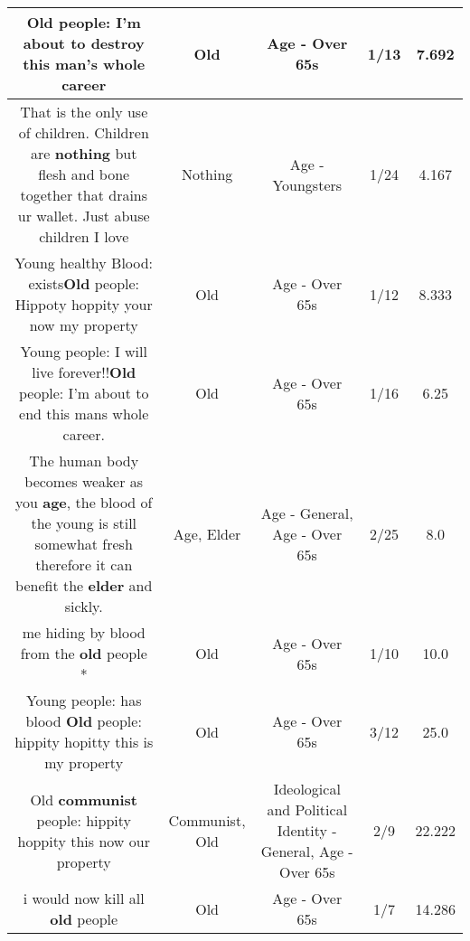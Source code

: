 \documentclass[11pt]{article}
\newlength\mylength
\begin{document}
\begin{center}
\begin{longtable}{|C{.65\mylength}|C{.30\mylength}|C{.12\mylength}|C{.12\mylength}|C{.12\mylength}|}
\textbf{Old} people: I'm about to destroy this man's whole career\normalsize   & Old & Age - Over 65s & 1/13 & 7.692 \\  \hline
  \small That is the only use of children. Children are \textbf{nothing} but flesh and bone together that drains ur wallet. Just abuse children I love\normalsize   & Nothing & Age - Youngsters & 1/24 & 4.167 \\  \hline
  \small Young healthy Blood: exists\textbf{Old} people: Hippoty hoppity your now my property\normalsize   & Old & Age - Over 65s & 1/12 & 8.333 \\  \hline
  \small Young people: I will live forever!!\textbf{Old} people: I'm about to end this mans whole career.\normalsize   & Old & Age - Over 65s & 1/16 & 6.25 \\  \hline
  \small The human body becomes weaker as you \textbf{age}, the blood of the young is still somewhat fresh therefore it can benefit the \textbf{elder} and sickly.\normalsize   & Age, Elder & Age - General, Age - Over 65s & 2/25 & 8.0 \\  \hline
  \small * me hiding by blood from the \textbf{old} people *\normalsize   & Old & Age - Over 65s & 1/10 & 10.0 \\  \hline
  \small Young people: has blood \textbf{Old} people: hippity hopitty this is my property\normalsize   & Old & Age - Over 65s & 3/12 & 25.0 \\  \hline
  \small Old \textbf{communist} people: hippity hoppity this now our property\normalsize   & Communist, Old &  Ideological and Political Identity - General, Age - Over 65s & 2/9 & 22.222 \\  \hline
  \small i would now kill all \textbf{old} people\normalsize   & Old & Age - Over 65s & 1/7 & 14.286 \\  \hline

\end{longtable}
\end{center}
\end{document}
